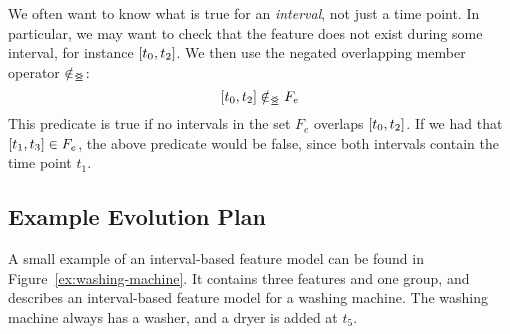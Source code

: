 We often want to know what is true for an \emph{interval}, not just a time point. In particular, we may want to check that the feature does not exist during some interval, for instance $\interval{t_0}{t_2}$. We then use the negated overlapping member operator $\notin_{\leq\!\!\!\!\geq{}}$:
\[
  \interval{t_0}{t_2} \notinnr F_e
\]
This predicate is true if no intervals in the set $F_e$ overlaps $\interval{t_0}{t_2}$. If we had that $\interval{t_1}{t_3} \in F_e$, the above predicate would be false, since both intervals contain the time point $t_1$.

\subsection{Example Evolution Plan}
A small example of an interval-based feature model can be found in Figure~\vref{ex:washing-machine}. It contains three features and one group, and describes an interval-based feature model for a washing machine. The washing machine always has a washer, and a dryer is added at $t_5$. 

